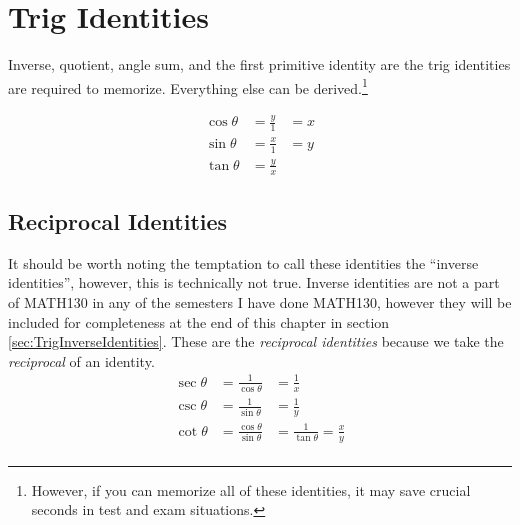 \chapter{Trig Identities}
\label{chap:TrigIdentities}
Inverse, quotient, angle sum, and the first primitive identity are the trig
identities are required to memorize. Everything else can be derived.\footnote{However, if you can memorize all of these identities, it may
save crucial seconds in test and exam situations.}

\begin{align}
  \cos \theta & = \frac{y}{1} & = x \\
  \sin \theta & = \frac{x}{1} & = y \\
  \tan \theta & = \frac{y}{x} &
\end{align}

\section{Reciprocal Identities}
\label{sec:TrigReciprocalIdentities}
It should be worth noting the temptation to call these identities the ``inverse
identities'', however, this is technically not true. Inverse identities are not
a part of MATH130 in any of the semesters I have done MATH130, however they will be
included for completeness at the end of this chapter in section
\ref{sec:TrigInverseIdentities}. These are the \emph{reciprocal identities}
because we take the \emph{reciprocal} of an identity.
\begin{align}
  \sec \theta & = \frac{1}{\cos \theta} & = \frac{1}{x} \\
  \csc \theta & = \frac{1}{\sin \theta} & = \frac{1}{y} \\
  \cot \theta & = \frac{\cos \theta}{\sin \theta} & = \frac{1}{\tan \theta} = \frac{x}{y} \\
\end{align}


